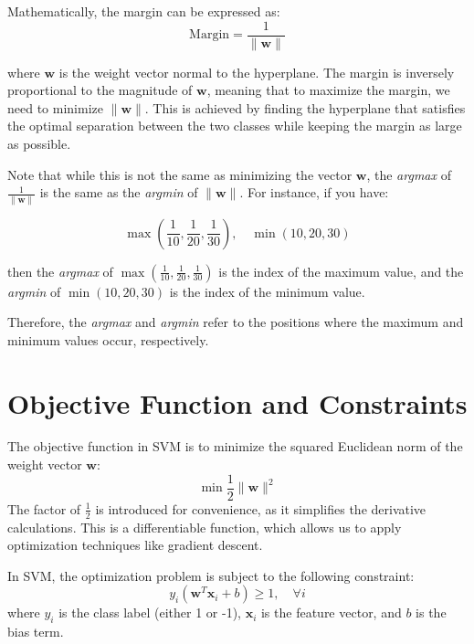 Mathematically, the margin can be expressed as:
\[
\text{Margin} = \frac{1}{\| \mathbf{w} \|}
\]

where \( \mathbf{w} \) is the weight vector normal to the hyperplane. The margin is inversely proportional to the magnitude of \( \mathbf{w} \), meaning that to maximize the margin, we need to minimize \( \| \mathbf{w} \| \). This is achieved by finding the hyperplane that satisfies the optimal separation between the two classes while keeping the margin as large as possible. 

Note that while this is not the same as minimizing the vector \( \mathbf{w} \), the \textit{argmax} of \( \frac{1}{\| \mathbf{w} \|} \) is the same as the \textit{argmin} of \( \| \mathbf{w} \| \). For instance, if you have:

\[
\max(\frac{1}{10}, \frac{1}{20}, \frac{1}{30}), \quad \min(10, 20, 30)
\]

then the \textit{argmax} of \( \max(\frac{1}{10}, \frac{1}{20}, \frac{1}{30}) \) is the index of the maximum value, and the \textit{argmin} of \( \min(10, 20, 30) \) is the index of the minimum value. 

Therefore, the \textit{argmax} and \textit{argmin} refer to the positions where the maximum and minimum values occur, respectively.

\section{Objective Function and Constraints}

The objective function in SVM is to minimize the squared Euclidean norm of the weight vector \( \mathbf{w} \):
\[
\min \frac{1}{2} \| \mathbf{w} \|^2
\]
The factor of \( \frac{1}{2} \) is introduced for convenience, as it simplifies the derivative calculations. This is a differentiable function, which allows us to apply optimization techniques like gradient descent.

In SVM, the optimization problem is subject to the following constraint:
\[
y_i (\mathbf{w}^T \mathbf{x}_i + b) \geq 1, \quad \forall i
\]
where \( y_i \) is the class label (either 1 or -1), \( \mathbf{x}_i \) is the feature vector, and \( b \) is the bias term.

